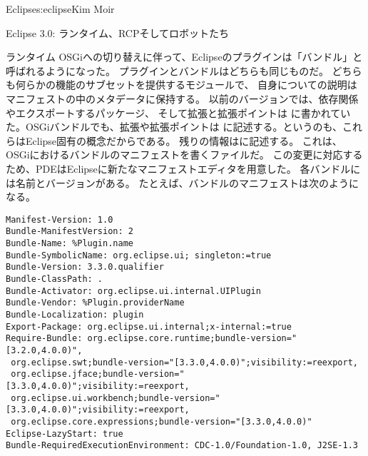 \begin{aosachapter}{Eclipse}{s:eclipse}{Kim Moir}
\begin{aosasect1}{Eclipse 3.0: ランタイム、RCPそしてロボットたち}
\begin{aosasect2}{ランタイム}
OSGiへの切り替えに伴って、Eclipseのプラグインは「バンドル」と呼ばれるようになった。
プラグインとバンドルはどちらも同じものだ。
どちらも何らかの機能のサブセットを提供するモジュールで、
自身についての説明はマニフェストの中のメタデータに保持する。
以前のバージョンでは、依存関係やエクスポートするパッケージ、
そして拡張と拡張ポイントは
に書かれていた。OSGiバンドルでも、拡張や拡張ポイントは
に記述する。というのも、これらはEclipse固有の概念だからである。
残りの情報はに記述する。
これは、OSGiにおけるバンドルのマニフェストを書くファイルだ。
この変更に対応するため、PDEはEclipseに新たなマニフェストエディタを用意した。
各バンドルには名前とバージョンがある。
たとえば、バンドルのマニフェストは次のようになる。

\begin{verbatim}
Manifest-Version: 1.0
Bundle-ManifestVersion: 2
Bundle-Name: %Plugin.name
Bundle-SymbolicName: org.eclipse.ui; singleton:=true
Bundle-Version: 3.3.0.qualifier
Bundle-ClassPath: .
Bundle-Activator: org.eclipse.ui.internal.UIPlugin
Bundle-Vendor: %Plugin.providerName
Bundle-Localization: plugin
Export-Package: org.eclipse.ui.internal;x-internal:=true
Require-Bundle: org.eclipse.core.runtime;bundle-version="[3.2.0,4.0.0)",
 org.eclipse.swt;bundle-version="[3.3.0,4.0.0)";visibility:=reexport,
 org.eclipse.jface;bundle-version="[3.3.0,4.0.0)";visibility:=reexport,
 org.eclipse.ui.workbench;bundle-version="[3.3.0,4.0.0)";visibility:=reexport,
 org.eclipse.core.expressions;bundle-version="[3.3.0,4.0.0)"
Eclipse-LazyStart: true
Bundle-RequiredExecutionEnvironment: CDC-1.0/Foundation-1.0, J2SE-1.3
\end{verbatim}


\end{aosasect2}
\end{aosasect1}
\end{aosachapter}
